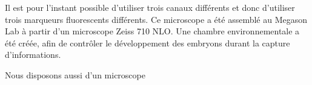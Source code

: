 Il est pour l'instant possible d'utiliser trois canaux différents et donc d'utiliser trois marqueurs fluorescents différents.
Ce microscope a été assemblé au Megason Lab à partir d'un microscope Zeiss 710 NLO.
Une chambre environnementale a été créée, afin de contrôler le développement des embryons durant la capture d'informations.

Nous disposons aussi d'un microscope 






\appendix







